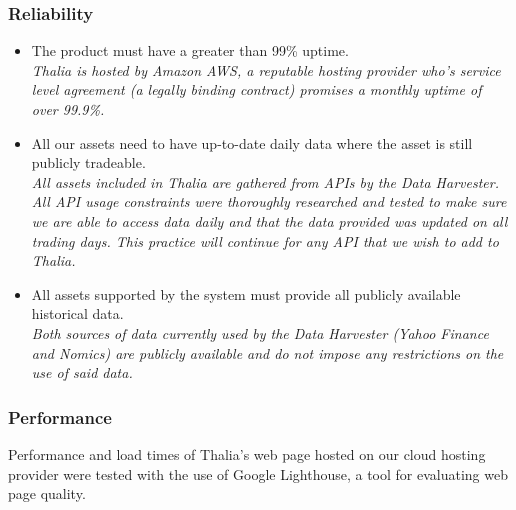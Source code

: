 \documentclass[main.tex]{subfiles}
\begin{document}
\subsubsection{Reliability}
\begin{itemize}

\item The product must have a greater than 99\% uptime.\\
\textit{Thalia is hosted by Amazon AWS, a reputable hosting provider who’s service level agreement (a legally binding contract) promises a monthly uptime of over 99.9\%\cite{amazonSLA}.}

\item All our assets need to have up-to-date daily data where the asset is still publicly tradeable.\\
\textit{All assets included in Thalia are gathered from APIs by the Data Harvester. All API usage constraints were thoroughly researched and tested to make sure we are able to access data daily and that the data provided was updated on all trading days. This practice will continue for any API that we wish to add to Thalia.}

\item All assets supported by the system must provide all publicly available historical data.\\
\textit{Both sources of data currently used by the Data Harvester (Yahoo Finance and Nomics) are publicly available and do not impose any restrictions on the use of said data.}

\end{itemize}

\subsubsection{Performance}
Performance and load times of Thalia's web page hosted on our cloud hosting provider were tested with the use of Google Lighthouse, a tool for evaluating web page quality.
\end{document}
